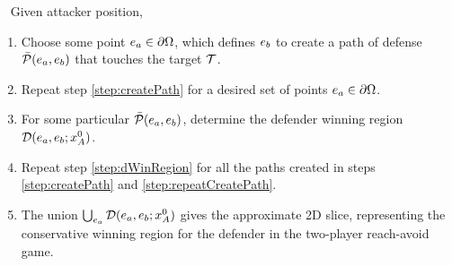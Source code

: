 \begin{alg}~ \label{alg:PD_RA}
Given attacker position,
\begin{enumerate}
\item Choose some point $e_a\in\partial\Omega$, which defines $e_b$ to create a path of defense $\bar{\mathcal{P}}(e_a,e_b)$ that touches the target $\mathcal{T}$. \label{step:createPath}
\item Repeat step \ref{step:createPath} for a desired set of points $e_a\in\partial\Omega$. \label{step:repeatCreatePath}
\item For some particular $\bar{\mathcal{P}}(e_a,e_b)$, determine the defender winning region $\mathcal{D}(e_a,e_b;x_A^0)$.\label{step:dWinRegion}
\item Repeat step \ref{step:dWinRegion} for all the paths created in steps \ref{step:createPath} and \ref{step:repeatCreatePath}.
\item The union $\bigcup_{e_a} \mathcal{D}(e_a,e_b;x_A^0)$ gives the approximate 2D slice, representing the conservative winning region for the defender in the two-player reach-avoid game. \label{step:union}
\end{enumerate}
\end{alg}

